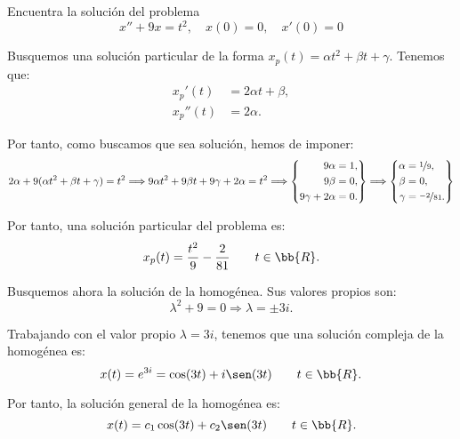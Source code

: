 \documentclass[12pt]{article}
\begin{document}
    \begin{ejercicio}
        Encuentra la solución del problema
        \[
            x'' + 9x = t^2, \quad x(0) = 0, \quad x'(0) = 0
        \]

        Busquemos una solución particular de la forma $x_p(t) = \alpha t^2+\beta t + \gamma$.
        Tenemos que:
        \begin{align*}
            x_p'(t) &= 2\alpha t + \beta, \\
            x_p''(t) &= 2\alpha.
        \end{align*}

        Por tanto, como buscamos que sea solución, hemos de imponer:
        \[
            2\alpha + 9(\alpha t^2 + \beta t + \gamma) = t^2
            \Longrightarrow 
            9\alpha t^2 + 9\beta t + 9\gamma + 2\alpha = t^2
            \Longrightarrow
            \left\{
                \begin{aligned}
                    9\alpha &= 1, \\
                    9\beta &= 0, \\
                    9\gamma + 2\alpha &= 0.
                \end{aligned}
            \right\}
            \Longrightarrow
            \left\{
                \begin{aligned}
                    \alpha &= \nicefrac{1}{9}, \\
                    \beta &= 0, \\
                    \gamma &= \nicefrac{-2}{81}.
                \end{aligned}
            \right\}
        \]

        Por tanto, una solución particular del problema es:
        \[
            x_p(t) = \frac{t^2}{9} - \frac{2}{81}\qquad t\in \bb{R}.
        \]

        Busquemos ahora la solución de la homogénea. Sus valores propios son:
        \[
            \lambda^2 + 9 = 0 \Longrightarrow \lambda = \pm 3i.
        \]

        Trabajando con el valor propio $\lambda = 3i$, tenemos que una solución compleja de la homogénea es:
        \begin{equation*}
            x(t)=e^{3i}=\cos(3t)+i\sen(3t)\qquad t\in \bb{R}.
        \end{equation*}

        Por tanto, la solución general de la homogénea es:
        \[
            x(t) = c_1\cos(3t) + c_2\sen(3t)\qquad t\in \bb{R}.
        \]


\end{ejercicio}
\end{document}
